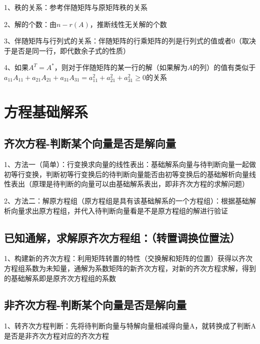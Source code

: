 1、秩的关系：参考伴随矩阵与原矩阵秩的关系

2、解的个数：由$n - r(A)$，推断线性无关解的个数

3、伴随矩阵与行列式的关系：伴随矩阵的行乘矩阵的列是行列式的值或者0（取决于是否是同一行，即代数余子式的性质）

4、如果$A^T=A^*$，则对于伴随矩阵的某一行的解（如果解为$A$的列）的值有类似于$a_{11}A_{11}+a_{21}A_{21}+a_{31}A_{31} = a_{11}^2 + a_{21}^2+a_{31}^2\ge 0$的关系

\section{方程基础解系}



\subsection{齐次方程-判断某个向量是否是解向量}

1、方法一（简单）：行变换求向量的线性表出：基础解系向量与待判断向量一起做初等行变换，判断初等行变换后的待判断向量能否由初等变换后的基础解析向量线性表出（原理是待判断的向量可以由基础解系表出，即非齐次方程的求解问题）

2、方法二：解原方程组（原方程组是具有该基础解系的一个方程组）：根据基础解析向量求出原方程组，并代入待判断向量看是不是原方程组的解进行验证



\subsection{已知通解，求解原齐次方程组：（转置调换位置法）}

1、构建新的齐次方程：利用矩阵转置的特性（交换解和矩阵的位置）获得以齐次方程组系数为未知量，通解为系数矩阵的新齐次方程，对新的齐次方程求解，得到的基础解系即是原齐次方程组的系数



\subsection{非齐次方程-判断某个向量是否是解向量}

1、转齐次方程判断：先将待判断向量与特解向量相减得向量A，就转换成了判断A是否是非齐次方程对应的齐次方程



